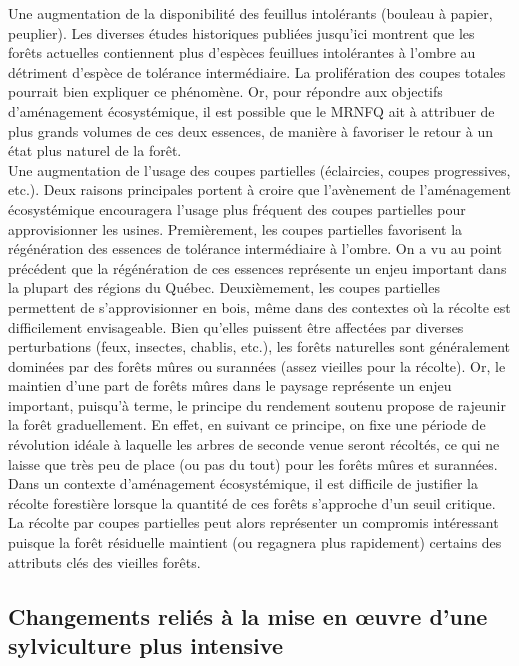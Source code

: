 Une augmentation de la disponibilité des feuillus intolérants (bouleau à papier, peuplier). Les diverses études historiques publiées jusqu'ici montrent que les forêts actuelles contiennent plus d'espèces feuillues intolérantes à l'ombre au détriment d'espèce de tolérance intermédiaire. La prolifération des coupes totales pourrait bien expliquer ce phénomène. Or, pour répondre aux objectifs d'aménagement écosystémique, il est possible que le MRNFQ ait à attribuer de plus grands volumes de ces deux essences, de manière à favoriser le retour à un état plus naturel de la forêt.
\\

Une augmentation de l'usage des coupes partielles (éclaircies, coupes progressives, etc.). Deux raisons principales portent à croire que l'avènement de l'aménagement écosystémique encouragera l'usage plus fréquent des coupes partielles pour approvisionner les usines. Premièrement, les coupes partielles favorisent la régénération des essences de tolérance intermédiaire à l'ombre. On a vu au point précédent que la régénération de ces essences représente un enjeu important dans la plupart des régions du Québec. Deuxièmement, les coupes partielles permettent de s'approvisionner en bois, même dans des contextes où la récolte est difficilement envisageable. Bien qu'elles puissent être affectées par diverses perturbations (feux, insectes, chablis, etc.), les forêts naturelles sont généralement dominées par des forêts mûres ou surannées (assez vieilles pour la récolte). Or, le maintien d'une part de forêts mûres dans le paysage représente un enjeu important, puisqu'à terme, le principe du rendement soutenu propose de rajeunir la forêt graduellement. En effet, en suivant ce principe, on fixe une période de révolution idéale à laquelle les arbres de seconde venue seront récoltés, ce qui ne laisse que très peu de place (ou pas du tout) pour les forêts mûres et surannées. Dans un contexte d'aménagement écosystémique, il est difficile de justifier la récolte forestière lorsque la quantité de ces forêts s'approche d'un seuil critique. La récolte par coupes partielles peut alors représenter un compromis intéressant puisque la forêt résiduelle maintient (ou regagnera plus rapidement) certains des attributs clés des vieilles forêts.


\subsection{Changements reliés à la mise en œuvre d'une sylviculture plus intensive}

